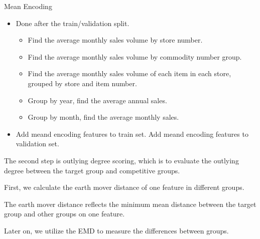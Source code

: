 \documentclass[
 size=14pt,
 paper=smartboard,  %
 mode=present, 		%
 display=slides, 	%
 style=tuliplab,  	%
 pauseslide,
 fleqn,leqno]{powerdot}
\begin{document}
\begin{slide}{Mean Encoding}
  \begin{itemize}
  \item
  Done after the train/validation split.
  
  \begin{itemize}
  \item
  Find the average monthly sales volume by store number.
  
  \item
  Find the average monthly sales volume by commodity number group.
  \item
  Find the average monthly sales volume of each item in each store, grouped by store and item number.
  \item
  Group by year, find the average annual sales.
  \item
  Group by month, find the average monthly sales.
  \end{itemize}
  \item
  Add meand encoding features to train set.
  Add meand encoding features to validation set.
  
  \end{itemize}
  
  \begin{note}
  The second step is outlying degree scoring,
  which is to evaluate the outlying degree between the target group and competitive groups.
  
  First,
  we calculate the earth mover distance of one feature in different groups.
  
  The earth mover distance reflects the minimum mean distance between
  the target group and other groups on one feature.
  
  Later on,
  we utilize the EMD to measure the differences between groups.
  \end{note}
  
  \end{slide}

\end{document}
